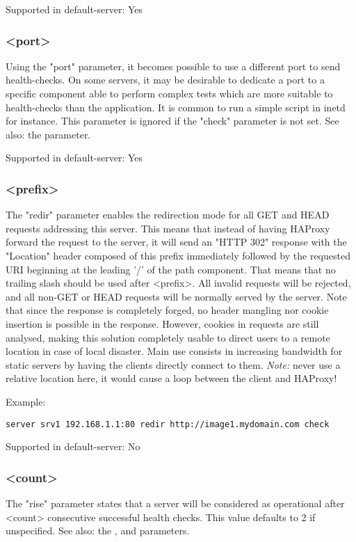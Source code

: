   Supported in default-server: Yes

\subsubsection[port]{ <port>}
  Using the "port" parameter, it becomes possible to use a different port to
  send health-checks. On some servers, it may be desirable to dedicate a port
  to a specific component able to perform complex tests which are more suitable
  to health-checks than the application. It is common to run a simple script in
  inetd for instance. This parameter is ignored if the "check" parameter is not
  set.
See also: the  parameter.

  Supported in default-server: Yes

\subsubsection[redir]{ <prefix>}
  The "redir" parameter enables the redirection mode for all GET and HEAD
  requests addressing this server. This means that instead of having HAProxy
  forward the request to the server, it will send an "HTTP 302" response with
  the "Location" header composed of this prefix immediately followed by the
  requested URI beginning at the leading '/' of the path component. That means
  that no trailing slash should be used after <prefix>. All invalid requests
  will be rejected, and all non-GET or HEAD requests will be normally served by
  the server. Note that since the response is completely forged, no header
  mangling nor cookie insertion is possible in the response. However, cookies in
  requests are still analysed, making this solution completely usable to direct
  users to a remote location in case of local disaster. Main use consists in
  increasing bandwidth for static servers by having the clients directly
  connect to them. \emph{Note:} never use a relative location here, it would cause a
  loop between the client and HAProxy!

  Example:
  
  \verb|server srv1 192.168.1.1:80 redir http://image1.mydomain.com check|

  Supported in default-server: No

\subsubsection[rise]{ <count>}
  The "rise" parameter states that a server will be considered as operational
  after <count> consecutive successful health checks. This value defaults to 2
  if unspecified.
See also: the ,  and  parameters.

